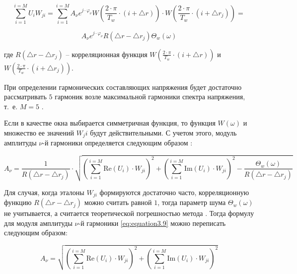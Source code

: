 \begin{equation}
	\label{eq:equation3.8}
	\displaystyle\sum_{i=1}^{i=M} U_i W_{ji} = \displaystyle\sum_{i=1}^{i=M} A_{\nu} e^{j \cdot \varphi_\nu} W\left( {\frac{2 \cdot \pi}{T_w} \cdot (i + \bigtriangleup r ) }\right) \cdot W\left( {\frac{2 \cdot \pi}{T_w} \cdot (i + \bigtriangleup r_j ) }\right) =
\end{equation}

\begin{equation}
\label{eq:equation3.8_1}
 A_{\nu} e^{j \cdot \varphi_\nu} R (\bigtriangleup r - \bigtriangleup r_j) \Theta_w(\omega)
\end{equation}

где $R (\bigtriangleup r - \bigtriangleup r_j)$ – корреляционная функция $W\left( {\frac{2 \cdot \pi}{T_w} \cdot (i + \bigtriangleup r) }\right)$  и $W\left( {\frac{2 \cdot \pi}{T_w} \cdot (i + \bigtriangleup r_j) }\right)$. 

При определении гармонических составляющих напряжения будет достаточно рассматривать $5$ гармоник возле максимальной гармоники спектра напряжения, т.~е. $M = 5$ \cite{Increase_Accuracy_Yelizarov2014}.
 
Если в качестве окна выбирается симметричная функция, то функция $W(\omega)$  и множество ее значений $W_ji$  будут действительными. С учетом этого, модуль амплитуды  $\nu$-й гармоники определяется следующим образом \cite{Increase_Accuracy_Yelizarov2014}:

\begin{equation}
	\label{eq:equation3.9}
	A_{\nu} = \frac{1}{R(\bigtriangleup r - \bigtriangleup r_j)} \cdot \sqrt{\left({\displaystyle\sum_{i=1}^{i=M}\mathrm{Re}(U_i) \cdot W_{ji}} \right)^2 + \left({\displaystyle\sum_{i=1}^{i=M}\mathrm{Im}(U_i) \cdot W_{ji}} \right)^2 - \frac{\Theta_w(\omega)}{R(\bigtriangleup r - \bigtriangleup r_j)}}
\end{equation}

Для случая, когда эталоны $W_{ji}$ формируются достаточно часто, корреляционную функцию $R(\bigtriangleup r - \bigtriangleup r_j) $  можно считать равной $1$, тогда параметр шума $\Theta_w(\omega)$ не учитывается, а считается теоретической погрешностью метода \cite{Increase_Accuracy_Yelizarov2014}. Тогда формулу для модуля амплитуды  $\nu$-й гармоники \ref{eq:equation3.9} можно переписать следующим образом:

\begin{equation}
	\label{eq:equation3.10}
	A_{\nu} =  \sqrt{\left({\displaystyle\sum_{i=1}^{i=M}\mathrm{Re}(U_i) \cdot W_{ji}} \right)^2 + \left({\displaystyle\sum_{i=1}^{i=M}\mathrm{Im}(U_i) \cdot W_{ji}} \right)^2}
\end{equation}

